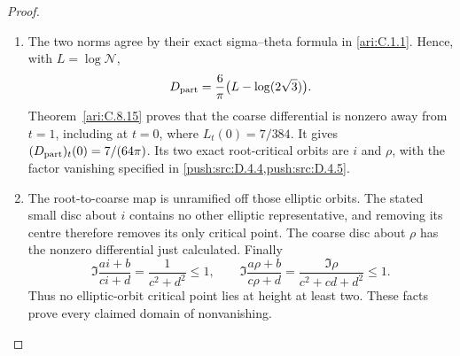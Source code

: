 \begin{proof}
\begin{enumerate}[label=\arabic*.,leftmargin=*]
\item The two norms agree by their exact sigma--theta formula in
\ref{ari:C.1.1}. Hence, with $L=\log\mathcal N$,
\[
 D_{\rm part}=\frac6\pi\bigl(L-\log(2\sqrt3)\bigr).
\]
Theorem~\ref{ari:C.8.15} proves that the coarse differential
is nonzero away from $t=1$, including at $t=0$, where
$L_t(0)=7/384$. It gives
$(D_{\rm part})_t(0)=7/(64\pi)$. Its two exact root-critical
orbits are $i$ and $\rho$, with the factor vanishing specified
in \ref{push:src:D.4.4,push:src:D.4.5}.

\item The root-to-coarse map is unramified off those elliptic orbits.
The stated small disc about $i$ contains no other elliptic
representative, and removing its centre therefore removes its
only critical point. The coarse disc about $\rho$ has the
nonzero differential just calculated. Finally
\[
 \Im\frac{ai+b}{ci+d}=\frac1{c^2+d^2}\le1,\qquad
 \Im\frac{a\rho+b}{c\rho+d}
 =\frac{\Im\rho}{c^2+cd+d^2}\le1.
\]
Thus no elliptic-orbit critical point lies at height at least two.
These facts prove every claimed domain of nonvanishing.
\end{enumerate}
\end{proof}



